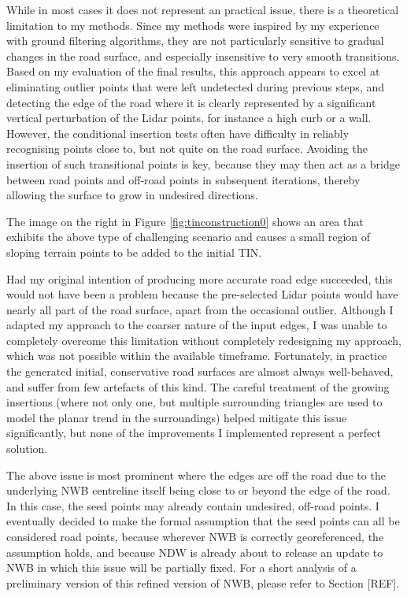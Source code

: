 While in most cases it does not represent an practical issue, there is a theoretical limitation to my methods. Since my methods were inspired by my experience with ground filtering algorithms, they are not particularly sensitive to gradual changes in the road surface, and especially insensitive to very smooth transitions. Based on my evaluation of the final results, this approach appears to excel at eliminating outlier points that were left undetected during previous steps, and detecting the edge of the road where it is clearly represented by a significant vertical perturbation of the Lidar points, for instance a high curb or a wall. However, the conditional insertion tests often have difficulty in reliably recognising points close to, but not quite on the road surface. Avoiding the insertion of such transitional points is key, because they may then act as a bridge between road points and off-road points in subsequent iterations, thereby allowing the surface to grow in undesired directions.

The image on the right in Figure \ref{fig:tinconstruction0} shows an area that exhibits the above type of challenging scenario and causes a small region of sloping terrain points to be added to the initial TIN.

Had my original intention of producing more accurate road edge succeeded, this would not have been a problem because the pre-selected Lidar points would have nearly all part of the road surface, apart from the occasional outlier. Although I adapted my approach to the coarser nature of the input edges, I was unable to completely overcome this limitation without completely redesigning my approach, which was not possible within the available timeframe. Fortunately, in practice the generated initial, conservative road surfaces are almost always well-behaved, and suffer from few artefacts of this kind. The careful treatment of the growing insertions (where not only one, but multiple surrounding triangles are used to model the planar trend in the surroundings) helped mitigate this issue significantly, but none of the improvements I implemented represent a perfect solution.

The above issue is most prominent where the edges are off the road due to the underlying NWB centreline itself being close to or beyond the edge of the road. In this case, the seed points may already contain undesired, off-road points. I eventually decided to make the formal assumption that the seed points can all be considered road points, because wherever NWB is correctly georeferenced, the assumption holds, and because NDW is already about to release an update to NWB in which this issue will be partially fixed. For a short analysis of a preliminary version of this refined version of NWB, please refer to Section [REF].


